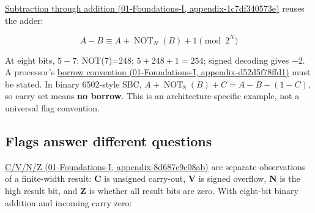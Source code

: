 \href{../01-Foundations-I/main.pdf\#nameddest=appendix-1c7df340573e}{Subtraction through addition (01-Foundations-I, appendix-1c7df340573e)} reuses the adder:

\[
A-B \equiv A+\operatorname{NOT}_N(B)+1\pmod{2^N}
\]

At eight bits, \(5-7\): NOT(7)=248; \(5+248+1=254\); signed decoding gives −2. A processor's \href{../01-Foundations-I/main.pdf\#nameddest=appendix-d52d5f78ffd1}{borrow convention (01-Foundations-I, appendix-d52d5f78ffd1)} must be stated. In binary 6502-style SBC, \(A+\operatorname{NOT}_8(B)+C=A-B-(1-C)\), so carry set means \textbf{no borrow}. This is an architecture-specific example, not a universal flag convention.

\subsection{Flags answer different questions}\label{05-engine-i-ch001-flags-answer-different-questions}

\href{../01-Foundations-I/main.pdf\#nameddest=appendix-8d687c9c08ab}{C/V/N/Z (01-Foundations-I, appendix-8d687c9c08ab)} are separate observations of a finite-width result: \textbf{C} is unsigned carry-out, \textbf{V} is signed overflow, \textbf{N} is the high result bit, and \textbf{Z} is whether all result bits are zero. With eight-bit binary addition and incoming carry zero:

